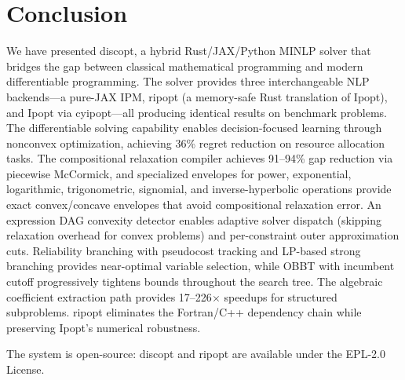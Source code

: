 \documentclass[12pt,preprint]{article}
\begin{document}
\section{Conclusion}
\label{org-conclusion}
We have presented discopt, a hybrid Rust/JAX/Python MINLP solver that bridges the gap between classical mathematical programming and modern differentiable programming. The solver provides three interchangeable NLP backends---a pure-JAX IPM, ripopt (a memory-safe Rust translation of Ipopt), and Ipopt via cyipopt---all producing identical results on benchmark problems. The differentiable solving capability enables decision-focused learning through nonconvex optimization, achieving 36\% regret reduction on resource allocation tasks. The compositional relaxation compiler achieves 91--94\% gap reduction via piecewise McCormick, and specialized envelopes for power, exponential, logarithmic, trigonometric, signomial, and inverse-hyperbolic operations provide exact convex/concave envelopes that avoid compositional relaxation error. An expression DAG convexity detector enables adaptive solver dispatch (skipping relaxation overhead for convex problems) and per-constraint outer approximation cuts. Reliability branching with pseudocost tracking and LP-based strong branching provides near-optimal variable selection, while OBBT with incumbent cutoff progressively tightens bounds throughout the search tree. The algebraic coefficient extraction path provides 17--226$\times$ speedups for structured subproblems. ripopt eliminates the Fortran/C++ dependency chain while preserving Ipopt's numerical robustness.


The system is open-source: discopt and ripopt are available under the EPL-2.0 License.




\end{document}
